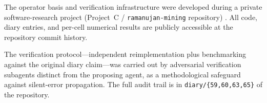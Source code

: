 \documentclass[11pt,reqno]{amsart}
\theoremstyle{definition}
\begin{document}
The operator basis and verification infrastructure were developed
during a private software-research project (Project~C /
\texttt{ramanujan-mining} repository) \cite{ProjectC}. All code, diary
entries, and per-cell numerical results are publicly accessible at the
repository commit history.

The verification protocol---independent reimplementation plus
benchmarking against the original diary claim---was carried out by
adversarial verification subagents distinct from the proposing agent,
as a methodological safeguard against silent-error propagation. The
full audit trail is in \verb|diary/{59,60,63,65}| of the repository.



\end{document}
